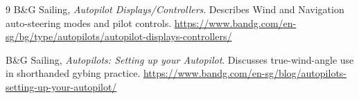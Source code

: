 \documentclass[10pt,twocolumn]{article}
\begin{document}
\begin{thebibliography}{9}
B\&G Sailing,
\emph{Autopilot Displays/Controllers}.  Describes Wind and Navigation auto-steering modes and pilot controls.
\url{https://www.bandg.com/en-sg/bg/type/autopilots/autopilot-displays-controllers/}

B\&G Sailing,
\emph{Autopilots: Setting up your Autopilot}.  Discusses true-wind-angle use in shorthanded gybing practice.
\url{https://www.bandg.com/en-sg/blog/autopilots-setting-up-your-autopilot/}

\end{thebibliography}
\end{document}
